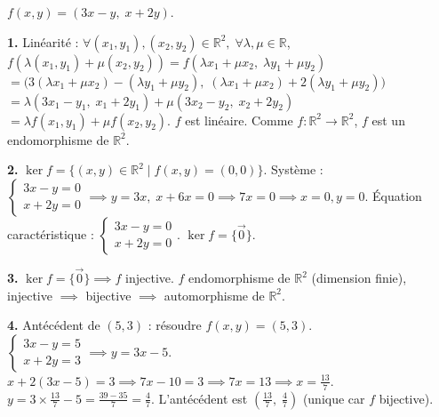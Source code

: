 \documentclass[11pt]{article}
\newcommand{\cle}[1]{{\popxbold\color{popdark}#1}}
\begin{document}
\begin{corrige}
$f(x,y)=(3x-y,\;x+2y)$.

\textbf{1.} Linéarité :
$\forall (x_1,y_1),(x_2,y_2)\in\mathbb{R}^2,\; \forall \lambda,\mu\in\mathbb{R}$,
$f(\lambda(x_1,y_1)+\mu(x_2,y_2)) = f(\lambda x_1+\mu x_2,\; \lambda y_1+\mu y_2)$
$= \big(3(\lambda x_1+\mu x_2)-(\lambda y_1+\mu y_2),\; (\lambda x_1+\mu x_2)+2(\lambda y_1+\mu y_2)\big)$
$= \lambda(3x_1-y_1,\;x_1+2y_1) + \mu(3x_2-y_2,\;x_2+2y_2)$
$= \lambda f(x_1,y_1) + \mu f(x_2,y_2)$.
$f$ est linéaire. Comme $f:\mathbb{R}^2\to\mathbb{R}^2$, $f$ est un \cle{endomorphisme} de $\mathbb{R}^2$.

\textbf{2.} $\ker f = \{(x,y)\in\mathbb{R}^2 \mid f(x,y)=(0,0)\}$.
Système : $\begin{cases} 3x-y=0 \\ x+2y=0 \end{cases} \implies y=3x,\; x+6x=0 \implies 7x=0 \implies x=0,y=0$.
\cle{Équation caractéristique} : $\begin{cases} 3x-y=0 \\ x+2y=0 \end{cases}$.
$\ker f = \{\vec{0}\}$.

\textbf{3.} $\ker f = \{\vec{0}\} \implies f$ injective. $f$ endomorphisme de $\mathbb{R}^2$ (dimension finie), injective $\implies$ bijective $\implies$ \cle{automorphisme} de $\mathbb{R}^2$.

\textbf{4.} Antécédent de $(5,3)$ : résoudre $f(x,y)=(5,3)$.
$\begin{cases} 3x-y=5 \\ x+2y=3 \end{cases} \implies y=3x-5$.
$x+2(3x-5)=3 \implies 7x-10=3 \implies 7x=13 \implies x=\frac{13}{7}$.
$y = 3\times\frac{13}{7}-5 = \frac{39-35}{7} = \frac{4}{7}$.
L'antécédent est $\boxed{\left(\frac{13}{7},\;\frac{4}{7}\right)}$ (unique car $f$ bijective).
\end{corrige}
\end{document}
